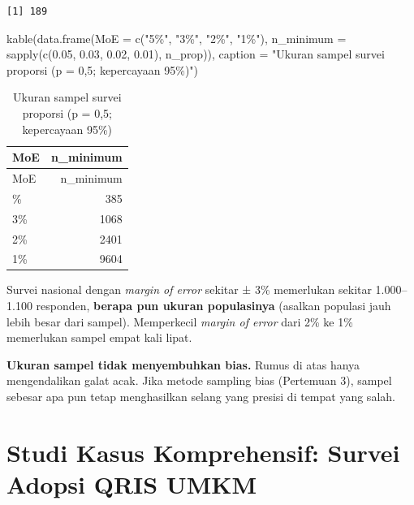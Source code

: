 \documentclass[
  indonesian,
  letterpaper,
]{book}
\newenvironment{Shaded}{\begin{snugshade}}{\end{snugshade}}
\newcommand{\AttributeTok}[1]{\textcolor[rgb]{0.40,0.45,0.13}{#1}}
\newcommand{\FloatTok}[1]{\textcolor[rgb]{0.68,0.00,0.00}{#1}}
\newcommand{\FunctionTok}[1]{\textcolor[rgb]{0.28,0.35,0.67}{#1}}
\newcommand{\NormalTok}[1]{\textcolor[rgb]{0.00,0.23,0.31}{#1}}
\newcommand{\StringTok}[1]{\textcolor[rgb]{0.13,0.47,0.30}{#1}}
\begin{document}
\begin{verbatim}
[1] 189
\end{verbatim}

\begin{Shaded}
\begin{Highlighting}[]
\FunctionTok{kable}\NormalTok{(}\FunctionTok{data.frame}\NormalTok{(}\AttributeTok{MoE =} \FunctionTok{c}\NormalTok{(}\StringTok{"5\%"}\NormalTok{, }\StringTok{"3\%"}\NormalTok{, }\StringTok{"2\%"}\NormalTok{, }\StringTok{"1\%"}\NormalTok{),}
                 \AttributeTok{n\_minimum =} \FunctionTok{sapply}\NormalTok{(}\FunctionTok{c}\NormalTok{(}\FloatTok{0.05}\NormalTok{, }\FloatTok{0.03}\NormalTok{, }\FloatTok{0.02}\NormalTok{, }\FloatTok{0.01}\NormalTok{), n\_prop)),}
      \AttributeTok{caption =} \StringTok{"Ukuran sampel survei proporsi (p = 0,5; kepercayaan 95\%)"}\NormalTok{)}
\end{Highlighting}
\end{Shaded}

\begin{longtable}[]{@{}lr@{}}
\caption{Ukuran sampel survei proporsi (p = 0,5; kepercayaan
95\%)}\tabularnewline
\toprule\noalign{}
MoE & n\_minimum \\
\midrule\noalign{}
\endfirsthead
\toprule\noalign{}
MoE & n\_minimum \\
\midrule\noalign{}
\endhead
\bottomrule\noalign{}
\endlastfoot
5\% & 385 \\
3\% & 1068 \\
2\% & 2401 \\
1\% & 9604 \\
\end{longtable}

Survei nasional dengan \emph{margin of error} sekitar ± 3\% memerlukan
sekitar 1.000--1.100 responden, \textbf{berapa pun ukuran populasinya}
(asalkan populasi jauh lebih besar dari sampel). Memperkecil
\emph{margin of error} dari 2\% ke 1\% memerlukan sampel empat kali
lipat.

\textbf{Ukuran sampel tidak menyembuhkan bias.} Rumus di atas hanya
mengendalikan galat acak. Jika metode sampling bias (Pertemuan 3),
sampel sebesar apa pun tetap menghasilkan selang yang presisi di tempat
yang salah.

\section{Studi Kasus Komprehensif: Survei Adopsi QRIS
UMKM}\label{studi-kasus-komprehensif-survei-adopsi-qris-umkm}
\end{document}
